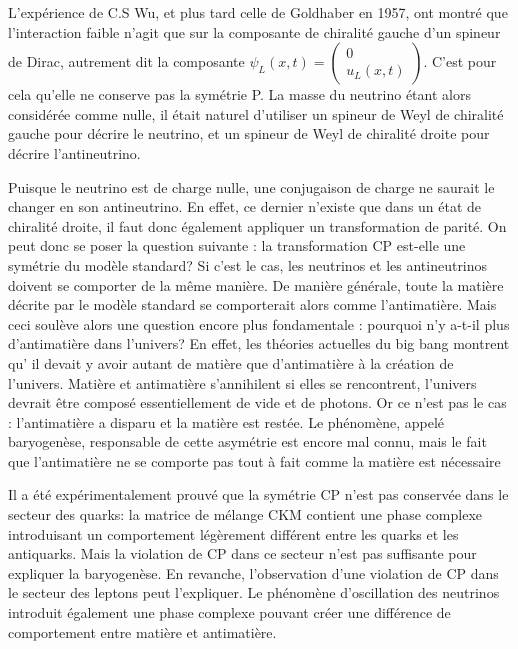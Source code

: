       L'expérience de C.S Wu, et plus tard celle de Goldhaber\cite{Goldhaber1958} en 1957, ont montré que l'interaction faible n'agit que sur la composante de chiralité gauche d'un spineur de Dirac, autrement dit la composante $\psi_L(x,t)=\left(\begin{matrix}0 \\ u_L(x,t)\end{matrix}\right)$. C'est pour cela qu'elle ne conserve pas la symétrie P. La masse du neutrino étant alors considérée comme nulle, il était naturel d'utiliser un spineur de Weyl de chiralité gauche pour décrire le neutrino, et un spineur de Weyl de chiralité droite pour décrire l'antineutrino.

      Puisque le neutrino est de charge nulle, une conjugaison de charge ne saurait le changer en son antineutrino. En effet, ce dernier n'existe que dans un état de chiralité droite, il faut donc également appliquer un transformation de parité. On peut donc se poser la question suivante : la transformation CP est-elle une symétrie du modèle standard? Si c'est le cas, les neutrinos et les antineutrinos doivent se comporter de la même manière. De manière générale, toute la matière décrite par le modèle standard se comporterait alors comme l'antimatière. Mais ceci soulève alors une question encore plus fondamentale : pourquoi n'y a-t-il plus d'antimatière dans l'univers? En effet, les théories actuelles du big bang\cite{Canetti2012} montrent qu' il devait y avoir autant de matière que d'antimatière à la création de l'univers. Matière et antimatière s'annihilent si elles se rencontrent, l'univers devrait être composé essentiellement de vide et de photons. Or ce n'est pas le cas : l'antimatière a disparu et la matière est restée. Le phénomène, appelé baryogenèse, responsable de cette asymétrie est encore mal connu, mais le fait que l'antimatière ne se comporte pas tout à fait comme la matière est nécessaire\cite{Sakharov1991}

      Il a été expérimentalement prouvé que la symétrie CP n'est pas conservée dans le secteur des quarks\cite{Collaboration2006,Charles2004,Kobayashi1973}: la matrice de mélange CKM contient une phase complexe introduisant un comportement légèrement différent entre les quarks et les antiquarks. Mais la violation de CP dans ce secteur n'est pas suffisante pour expliquer la baryogenèse\cite{Riotto1998}. En revanche, l'observation d'une violation de CP dans le secteur des leptons peut l'expliquer\cite{Davidson2008}. Le phénomène d'oscillation des neutrinos introduit également une phase complexe pouvant créer une différence de comportement entre matière et antimatière.

